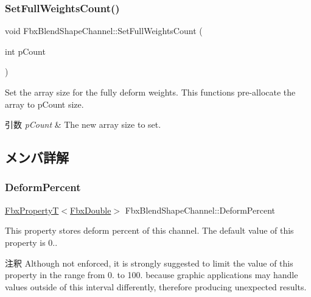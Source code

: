 \subsubsection{\texorpdfstring{Set\+Full\+Weights\+Count()}{SetFullWeightsCount()}}
{\footnotesize\ttfamily void Fbx\+Blend\+Shape\+Channel\+::\+Set\+Full\+Weights\+Count (\begin{DoxyParamCaption}\item[{int}]{p\+Count }\end{DoxyParamCaption})}

Set the array size for the fully deform weights. This functions pre-\/allocate the array to p\+Count size. 
\begin{DoxyParams}{引数}
{\em p\+Count} & The new array size to set. \\
\hline
\end{DoxyParams}


\subsection{メンバ詳解}
\mbox{\label{class_fbx_blend_shape_channel_a7b6c288c4f2d70fed6f29b424d7020a4}} 
\subsubsection{\texorpdfstring{Deform\+Percent}{DeformPercent}}
{\footnotesize\ttfamily \hyperlink{class_fbx_property_t}{Fbx\+PropertyT}$<$\hyperlink{fbxtypes_8h_a171e72a1c46fc15c1a6c9c31948c1c5b}{Fbx\+Double}$>$ Fbx\+Blend\+Shape\+Channel\+::\+Deform\+Percent}

This property stores deform percent of this channel. The default value of this property is 0..

\begin{DoxyRemark}{注釈}
Although not enforced, it is strongly suggested to limit the value of this property in the range from 0. to 100. because graphic applications may handle values outside of this interval differently, therefore producing unexpected results. 
\end{DoxyRemark}
\mbox{\label{class_fbx_blend_shape_channel_a99111b4513741df3e42dd87b1c08d347}} 
